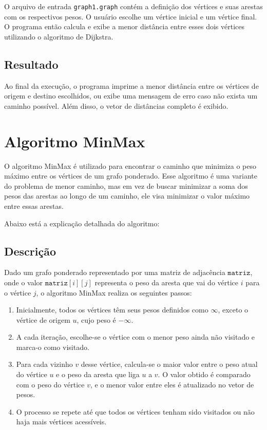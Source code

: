 \documentclass[12pt]{article}
\begin{document}
O arquivo de entrada \texttt{graph1.graph} contém a definição dos vértices e suas arestas com os respectivos pesos. O usuário escolhe um vértice inicial e um vértice final. O programa então calcula e exibe a menor distância entre esses dois vértices utilizando o algoritmo de Dijkstra.

\subsection{Resultado}

Ao final da execução, o programa imprime a menor distância entre os vértices de origem e destino escolhidos, ou exibe uma mensagem de erro caso não exista um caminho possível. Além disso, o vetor de distâncias completo é exibido.

\section{Algoritmo MinMax}

O algoritmo MinMax é utilizado para encontrar o caminho que minimiza o peso máximo entre os vértices de um grafo ponderado. Esse algoritmo é uma variante do problema de menor caminho, mas em vez de buscar minimizar a soma dos pesos das arestas ao longo de um caminho, ele visa minimizar o valor máximo entre essas arestas.

Abaixo está a explicação detalhada do algoritmo:

\subsection{Descrição}

Dado um grafo ponderado representado por uma matriz de adjacência \( \texttt{matriz} \), onde o valor \( \texttt{matriz}[i][j] \) representa o peso da aresta que vai do vértice \( i \) para o vértice \( j \), o algoritmo MinMax realiza os seguintes passos:

\begin{enumerate}
    \item Inicialmente, todos os vértices têm seus pesos definidos como \( \infty \), exceto o vértice de origem \( u \), cujo peso é \( -\infty \). 
    \item A cada iteração, escolhe-se o vértice com o menor peso ainda não visitado e marca-o como visitado.
    \item Para cada vizinho \( v \) desse vértice, calcula-se o maior valor entre o peso atual do vértice \( u \) e o peso da aresta que liga \( u \) a \( v \). O valor obtido é comparado com o peso do vértice \( v \), e o menor valor entre eles é atualizado no vetor de pesos.
    \item O processo se repete até que todos os vértices tenham sido visitados ou não haja mais vértices acessíveis.
\end{enumerate}
\end{document}
